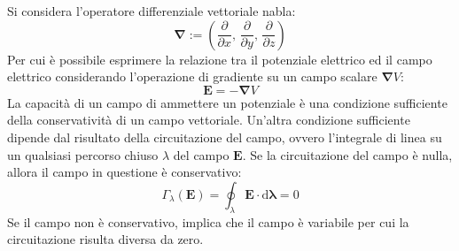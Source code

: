 \documentclass{article}
\newcommand{\vect}[1]{\boldsymbol{\mathbf{#1}}}
\newcommand{\df}{\mathrm{d}}
\numberwithin{equation}{subsection}
\begin{document}
Si considera l'operatore differenziale vettoriale nabla: 
\begin{equation*}
    {\vect\nabla}:=\left(\displaystyle\frac{\partial}{\partial x},\,\frac{\partial}{\partial y},\,\frac{\partial}{\partial z}\right)
\end{equation*}
Per cui è possibile esprimere la relazione tra il potenziale elettrico ed il campo elettrico considerando l'operazione di gradiente su un campo scalare $\vect{\vect\nabla}V$: 
\begin{equation}
    \vect{E}=-{\vect\nabla}V
\end{equation}
La capacità di un campo di ammettere un potenziale è una condizione sufficiente della conservatività di un campo vettoriale. Un'altra condizione sufficiente dipende dal 
risultato della circuitazione del campo, ovvero l'integrale di linea su un qualsiasi percorso chiuso $\lambda$ del campo $\vect{E}$. Se la circuitazione del campo è nulla, 
allora il campo in questione è conservativo:
\begin{equation}
    \Gamma_\lambda(\vect{E})=\displaystyle\oint_{\lambda}\vect{E}\cdot \df\vect{\lambda}=0
\end{equation}
Se il campo non è conservativo, implica che il campo è variabile per cui la circuitazione risulta diversa da zero. 
\end{document}
